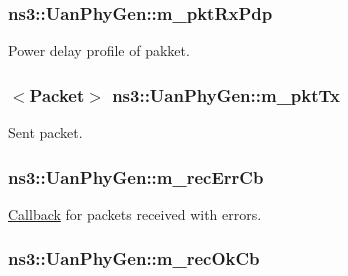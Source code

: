 \subsubsection[{\texorpdfstring{m\+\_\+pkt\+Rx\+Pdp}{m_pktRxPdp}}]{ ns3\+::\+Uan\+Phy\+Gen\+::m\+\_\+pkt\+Rx\+Pdp\hspace{0.3cm}{\ttfamily [private]}}\hypertarget{classns3_1_1UanPhyGen_af24f3aed137da95684f10c963e8fb2ff}{}\label{classns3_1_1UanPhyGen_af24f3aed137da95684f10c963e8fb2ff}


Power delay profile of pakket. 

\subsubsection[{\texorpdfstring{m\+\_\+pkt\+Tx}{m_pktTx}}]{$<${\bf Packet}$>$ ns3\+::\+Uan\+Phy\+Gen\+::m\+\_\+pkt\+Tx\hspace{0.3cm}{\ttfamily [private]}}\hypertarget{classns3_1_1UanPhyGen_ada7c2cd782b02a4048df9dfc8970017c}{}\label{classns3_1_1UanPhyGen_ada7c2cd782b02a4048df9dfc8970017c}


Sent packet. 

\subsubsection[{\texorpdfstring{m\+\_\+rec\+Err\+Cb}{m_recErrCb}}]{ ns3\+::\+Uan\+Phy\+Gen\+::m\+\_\+rec\+Err\+Cb\hspace{0.3cm}{\ttfamily [private]}}\hypertarget{classns3_1_1UanPhyGen_ace08b70be192456009688df2cf1a56fc}{}\label{classns3_1_1UanPhyGen_ace08b70be192456009688df2cf1a56fc}


\hyperlink{classns3_1_1Callback}{Callback} for packets received with errors. 

\subsubsection[{\texorpdfstring{m\+\_\+rec\+Ok\+Cb}{m_recOkCb}}]{ ns3\+::\+Uan\+Phy\+Gen\+::m\+\_\+rec\+Ok\+Cb\hspace{0.3cm}{\ttfamily [private]}}\hypertarget{classns3_1_1UanPhyGen_a78a00aec0ebac16ef76664a77649ddf0}{}\label{classns3_1_1UanPhyGen_a78a00aec0ebac16ef76664a77649ddf0}


